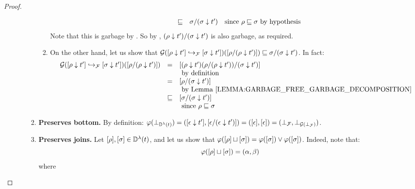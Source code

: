 \begin{proof}
\begin{enumerate}
\begin{enumerate}
\begin{enumerate}
\begin{enumerate}
\[\begin{array}{rcll}
              & \sqsubseteq & \sigma/(\sigma \downarrow t') & \text{since $\rho \sqsubseteq \sigma$ by hypothesis} \\
              \end{array}
            \]
            Note that this is garbage by .
            So by , $(\rho \downarrow t')/(\sigma \downarrow t')$ is also garbage,
            as required.
      \item On the other hand, let us show that
            $\mathcal{G}({[\rho \downarrow t']} \hookrightarrow_{\mathcal{F}} {[\sigma \downarrow t']})({[\rho/(\rho \downarrow t')]})
            \sqsubseteq
            \sigma/(\sigma \downarrow t')$.
            In fact:
            \[
              \begin{array}{rcl}
                \ulbG(\ptF{\cls{\redseqtwo \sieve \tm'}}{\cls{\redseq \sieve \tm'}})(\cls{\redseq/(\redseq \sieve \tm')})
              & = &
                \cls{ (\redseq \sieve \tm')(\redseq/(\redseq \sieve \tm')) / (\redseqtwo \sieve \tm') } \\
              &   & \text{ by definition} \\
              & = &
                \cls{ \redseq / (\redseqtwo \sieve \tm') } \\
              &   & \text{ by \rlem{garbage_free_garbage_decomposition}} \\
              & \permle &
                \cls{ \redseqtwo / (\redseqtwo \sieve \tm') } \\
              &   & \text{ since $\redseq \permle \redseqtwo$} \\
              \end{array}
            \]
      \end{enumerate}
    \item {\bf Preserves bottom.}
      By definition:
      $\varphi(\bot_{\mathbb{D}^{\lambda}(t)})
       = ({[\epsilon \downarrow t']}, {[\epsilon/(\epsilon \downarrow t')]})
       = ({[\epsilon]},{[\epsilon]})
       = (\bot_{\mathcal{F}},\bot_{\mathcal{G}(\bot_{\mathcal{F}})})$.
    \item {\bf Preserves joins.}
      Let ${[\rho]},{[\sigma]} \in \mathbb{D}^{\lambda}(t)$, and let us show that
      $\varphi({[\rho]} \sqcup {[\sigma]}) = \varphi({[\sigma]}) \lor \varphi({[\sigma]})$.
      Indeed, note that:
      \[
        \varphi({[\rho]} \sqcup {[\sigma]}) = (\alpha,\beta)
      \]
      where
      \[
\]
\end{enumerate}
\end{enumerate}
\end{enumerate}
\end{proof}
